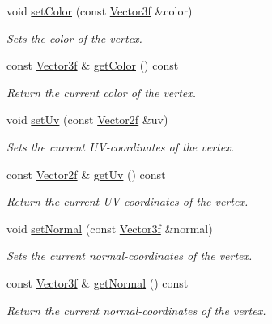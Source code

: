 \begin{DoxyCompactItemize}
void \hyperlink{classburn_1_1_vertex_a57e2bf8a6e58c7d02c8431f03239cc6b}{set\-Color} (const \hyperlink{namespaceburn_a9d6d349c94bc4dc9699427216128a0ef}{Vector3f} \&color)
\begin{DoxyCompactList}\small\item\em Sets the color of the vertex. \end{DoxyCompactList}\item 
const \hyperlink{namespaceburn_a9d6d349c94bc4dc9699427216128a0ef}{Vector3f} \& \hyperlink{classburn_1_1_vertex_a1dcb11a63a04b0e279e8a69df85dd8d6}{get\-Color} () const 
\begin{DoxyCompactList}\small\item\em Return the current color of the vertex. \end{DoxyCompactList}\item 
void \hyperlink{classburn_1_1_vertex_afc4eff1b4065852cb856b690006e0bd8}{set\-Uv} (const \hyperlink{namespaceburn_a2af71ec5609a2f2d501827804e86a9b8}{Vector2f} \&uv)
\begin{DoxyCompactList}\small\item\em Sets the current U\-V-\/coordinates of the vertex. \end{DoxyCompactList}\item 
const \hyperlink{namespaceburn_a2af71ec5609a2f2d501827804e86a9b8}{Vector2f} \& \hyperlink{classburn_1_1_vertex_a277e9b082825c211acf730b46580301a}{get\-Uv} () const 
\begin{DoxyCompactList}\small\item\em Return the current U\-V-\/coordinates of the vertex. \end{DoxyCompactList}\item 
void \hyperlink{classburn_1_1_vertex_afad866f5f2e1c303fb7cf8902ee7180e}{set\-Normal} (const \hyperlink{namespaceburn_a9d6d349c94bc4dc9699427216128a0ef}{Vector3f} \&normal)
\begin{DoxyCompactList}\small\item\em Sets the current normal-\/coordinates of the vertex. \end{DoxyCompactList}\item 
const \hyperlink{namespaceburn_a9d6d349c94bc4dc9699427216128a0ef}{Vector3f} \& \hyperlink{classburn_1_1_vertex_a5f0844ff20f84c3fedabb5f9352f97ff}{get\-Normal} () const 
\begin{DoxyCompactList}\small\item\em Return the current normal-\/coordinates of the vertex. \end{DoxyCompactList}\end{DoxyCompactItemize}


